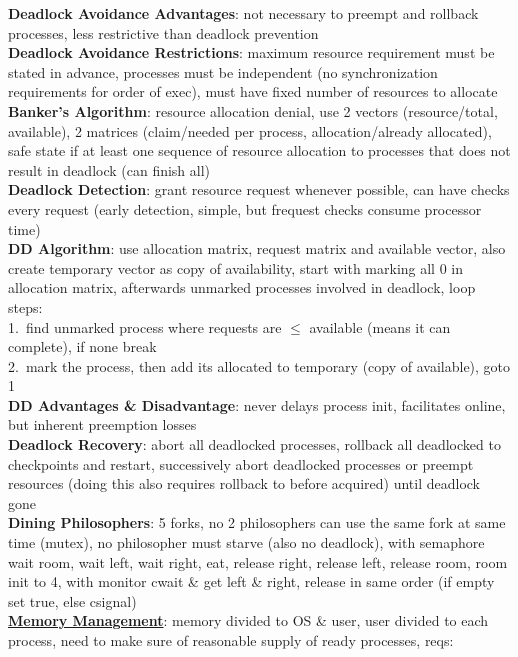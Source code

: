 \documentclass[a4paper]{article}
\begin{document}
\begin{multicols}{2}
        \textbf{Deadlock Avoidance Advantages}: not necessary to preempt and rollback processes, less restrictive than deadlock prevention\\
        \textbf{Deadlock Avoidance Restrictions}: maximum resource requirement must be stated in advance, processes must be independent (no synchronization requirements for order of exec), must have fixed number of resources to allocate\\
        \textbf{Banker's Algorithm}: resource allocation denial, use 2 vectors (resource/total, available), 2 matrices (claim/needed per process, allocation/already allocated), safe state if at least one sequence of resource allocation to processes that does not result in deadlock (can finish all)\\
        \textbf{Deadlock Detection}: grant resource request whenever possible, can have checks every request (early detection, simple, but frequest checks consume processor time)\\
        \textbf{DD Algorithm}: use allocation matrix, request matrix and available vector, also create temporary vector as copy of availability, start with marking all 0 in allocation matrix, afterwards unmarked processes involved in deadlock, loop steps:\\
        1.\ find unmarked process where requests are $\leq$ available (means it can complete), if none break\\
        2.\ mark the process, then add its allocated to temporary (copy of available), goto 1\\
        \textbf{DD Advantages \& Disadvantage}: never delays process init, facilitates online, but inherent preemption losses\\
        \textbf{Deadlock Recovery}: abort all deadlocked processes, rollback all deadlocked to checkpoints and restart, successively abort deadlocked processes or preempt resources (doing this also requires rollback to before acquired) until deadlock gone\\
        \textbf{Dining Philosophers}: 5 forks, no 2 philosophers can use the same fork at same time (mutex), no philosopher must starve (also no deadlock), with semaphore wait room, wait left, wait right, eat, release right, release left, release room, room init to 4, with monitor cwait \& get left \& right, release in same order (if empty set true, else csignal)\\
        \underline{\textbf{Memory Management}}: memory divided to OS \& user, user divided to each process, need to make sure of reasonable supply of ready processes, reqs:\\

\end{multicols}
\end{document}

